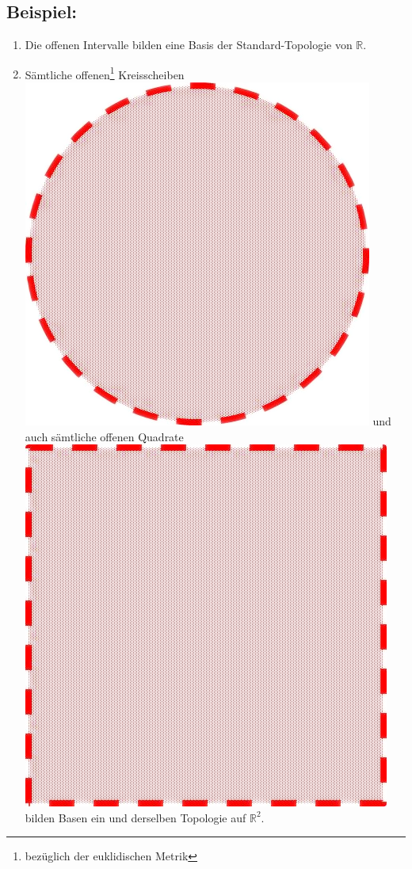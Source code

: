 \documentclass[a4paper,11pt,notitlepage]{report}
\theoremstyle{definition}
\newcommand{\R}{{\ensuremath{\mathbb{R}}}}
\newenvironment{bsp}[1]
{
\setlength{\fboxsep}{10pt}
\subsection*{Beispiel: #1}
\begin{upshape}
}
{
\end{upshape}
}
\begin{document}
\begin{bsp}{}
	\begin{enumerate}[(1)]
		\item Die offenen Intervalle bilden eine Basis der Standard-Topologie von $\R$.
		\item Sämtliche offenen\footnote{bezüglich der euklidischen Metrik} Kreisscheiben \includegraphics[scale=0.07]{images/offener_Kreis.png} und auch sämtliche offenen Quadrate \includegraphics[scale=0.07]{images/offenes_Quadrat.png} bilden Basen ein und derselben Topologie auf $\R^2$.
	\end{enumerate}
\end{bsp}
\end{document}
